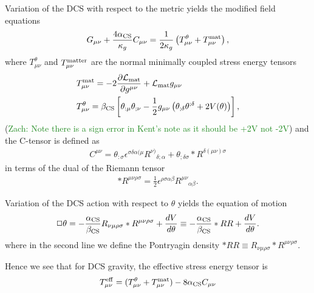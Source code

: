 \documentclass[aps,prd,amsmath,showpacs,amssymb,superscriptaddress,nofootinbib,longbibliography,eqsecnum,preprintnumbers]{revtex4-1}
\newcommand{\zach}[1]{\textcolor{ForestGreen}{#1}}
\newcommand{\acs}{\alpha_{\rm CS}}
\newcommand{\bcs}{\beta_{\rm CS}}
\begin{document}
Variation of the DCS with respect to the metric yields the modified field equations
\begin{align}
G_{\mu \nu}+\frac{4\acs}{\kappa_g}C_{\mu \nu}=\frac{1}{2\kappa_g}\left(T_{\mu \nu}^\theta+T_{\mu \nu}^{\rm mat}\right), \label{eq:modE}
\end{align}
where $T_{\mu \nu} ^\theta$ and $T_{\mu \nu}^{\rm matter}$ are the normal minimally coupled stress energy tensors
\begin{align}
&T_{\mu \nu}^{\rm mat}=-2\frac{\partial\mathcal{L}_{\rm mat}}{\partial g^{\mu \nu}}+\mathcal{L}_{\rm mat}g_{\mu \nu} \nonumber \\
&T_{\mu \nu}^\theta = \bcs\left[\theta_{:\mu} \theta_{;\nu}-\frac{1}{2}g_{\mu \nu}\left(\theta_{;\delta}\theta^{;\delta}+2V(\theta)\right)\right],
\end{align}
(\zach{Zach: Note there is a sign error in Kent's note as it should be +2V not -2V})
and the C-tensor is defined as
\begin{align}
C^{\mu \nu}=\theta_{:\sigma}\epsilon^{\sigma\delta\alpha(\mu}R^{\nu)}{}_{\delta;\alpha}+\theta_{;\delta \sigma}*R^{\delta(\mu\nu)\sigma}
\end{align}
in terms of the dual of the Riemann tensor
\begin{align}
*R^{\mu\nu\rho\sigma}=\frac{1}{2}\epsilon^{\rho\sigma\alpha\beta}R^{\mu\nu}{}_{\alpha\beta}.
\end{align}

Variation of the DCS action with respect to $\theta$ yields the equation of motion
\begin{align}
\Box \theta= -\frac{\acs}{\bcs}R_{\nu\mu\rho\sigma}*R^{\mu\nu \rho \sigma}+\frac{dV}{d\theta}\equiv  -\frac{\acs}{\bcs}*RR+\frac{dV}{d\theta}. \label{eq:SEOM}
\end{align}
where in the second line we define the Pontryagin density $*RR\equiv R_{\nu\mu\rho \sigma}*R^{\mu\nu\rho\sigma}$.

Hence we see that for DCS gravity, the effective stress energy tensor  is
\begin{align}
T_{\mu \nu} ^{\rm eff}=(T_{\mu\nu}^\theta +T_{\mu \nu}^{\rm mat})-8\acs C_{\mu \nu}
\end{align}
\end{document}
